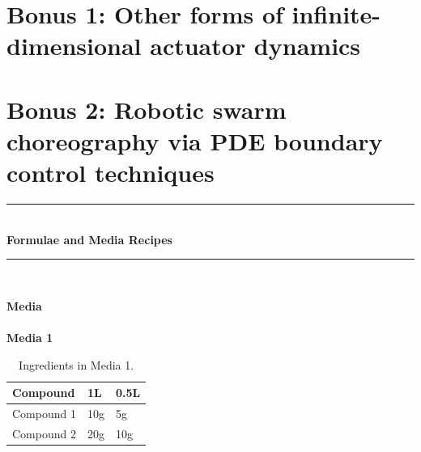 \documentclass[idxtotoc,hyperref,openany]{labbook} %
\newcommand{\HRule}{\rule{\linewidth}{0.5mm}} %
\begin{document}
\section{Bonus 1: Other forms of infinite-dimensional actuator dynamics}

\section{Bonus 2: Robotic swarm choreography via PDE boundary control techniques}







\labday{} %

\begin{center}
\HRule \\[0.4cm]
{\huge \textbf{Formulae and Media Recipes}}\\[0.4cm] %
\HRule \\[1.5cm]
\end{center}


\newpage

\huge \textbf{Media} \\ \\

\normalsize \textbf{Media 1}\\
\begin{table}[H]
\begin{tabular}{l l l}
\toprule
\textbf{Compound} & \textbf{1L} & \textbf{0.5L}\\
\toprule
Compound 1 & 10g & 5g\\
Compound 2 & 20g & 10g\\
\bottomrule
\end{tabular}
\caption{Ingredients in Media 1.}
\label{tab:med1}
\end{table}



\end{document}
